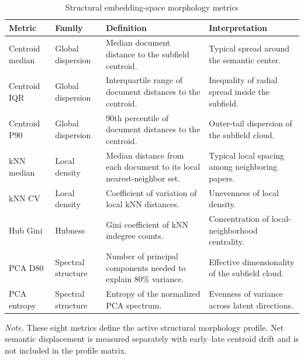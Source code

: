 \begin{table}[H]
\centering
\caption[Structural embedding-space morphology metrics]{Structural embedding-space morphology metrics}
\label{tab:metric_core}
\scriptsize
\begin{tabular}{@{}p{}p{}p{}p{}@{}}
\hline
\textbf{Metric} & \textbf{Family} & \textbf{Definition} & \textbf{Interpretation} \\
\hline
Centroid median & Global dispersion & Median document distance to the subfield centroid. & Typical spread around the semantic center. \\[0.12cm]
Centroid IQR & Global dispersion & Interquartile range of document distances to the centroid. & Inequality of radial spread inside the subfield. \\[0.12cm]
Centroid P90 & Global dispersion & 90th percentile of document distances to the centroid. & Outer-tail dispersion of the subfield cloud. \\[0.12cm]
kNN median & Local density & Median distance from each document to its local nearest-neighbor set. & Typical local spacing among neighboring papers. \\[0.12cm]
kNN CV & Local density & Coefficient of variation of local kNN distances. & Unevenness of local density. \\[0.12cm]
Hub Gini & Hubness & Gini coefficient of kNN indegree counts. & Concentration of local-neighborhood centrality. \\[0.12cm]
PCA D80 & Spectral structure & Number of principal components needed to explain 80\% variance. & Effective dimensionality of the subfield cloud. \\[0.12cm]
PCA entropy & Spectral structure & Entropy of the normalized PCA spectrum. & Evenness of variance across latent directions. \\[0.12cm]
\hline
\end{tabular}
\par\vspace{0.12cm}
\footnotesize\textit{Note.} These eight metrics define the active structural morphology profile. Net semantic displacement is measured separately with early--late centroid drift and is not included in the profile matrix.
\end{table}
